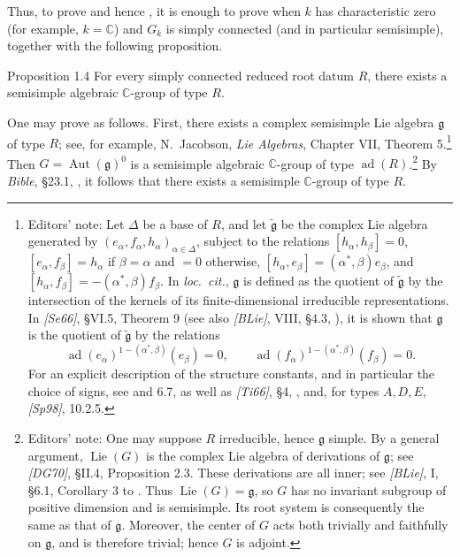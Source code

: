 Thus, to prove  and hence , it is enough to prove  when \(k\) has
characteristic zero (for example, \(k=\mathbb C\)) and \(G_k\) is simply
connected (and in particular semisimple), together with the following
proposition.

\begin{sgastatement}{Proposition 1.4}
For every simply connected reduced root datum \(R\), there exists a semisimple
algebraic \(\mathbb C\)-group of type \(R\).
\end{sgastatement}

One may prove  as follows. First, there exists a complex semisimple Lie
algebra \(\mathfrak g\) of type \(R\); see, for example, N.~Jacobson,
\textit{Lie Algebras}, Chapter VII, Theorem 5.\footnote{Editors' note:
Let \(\Delta\) be a base of \(R\), and let \(\widetilde{\mathfrak g}\) be the
complex Lie algebra generated by
\((e_\alpha,f_\alpha,h_\alpha)_{\alpha\in\Delta}\), subject to the relations
\([h_\alpha,h_\beta]=0\), \([e_\alpha,f_\beta]=h_\alpha\) if
\(\beta=\alpha\) and \(=0\) otherwise,
\([h_\alpha,e_\beta]=(\alpha^\ast,\beta)e_\beta\), and
\([h_\alpha,f_\beta]=-(\alpha^\ast,\beta)f_\beta\).
In \emph{loc.\ cit.}, \(\mathfrak g\) is defined as the quotient of
\(\widetilde{\mathfrak g}\) by the intersection of the kernels of its
finite-dimensional irreducible representations. In \emph{[Se66]},
\S VI.5, Theorem 9 (see also \emph{[BLie]}, VIII, \S4.3, ), it is
shown that \(\mathfrak g\) is the quotient of \(\widetilde{\mathfrak g}\) by
the relations
\[
 \operatorname{ad}(e_\alpha)^{1-(\alpha^\ast,\beta)}(e_\beta)=0,\qquad
 \operatorname{ad}(f_\alpha)^{1-(\alpha^\ast,\beta)}(f_\beta)=0.
\]
For an explicit description of the structure constants, and in particular
the choice of signs, see  and 6.7, as well as
\emph{[Ti66]}, \S4, , and, for types \(A,D,E\),
\emph{[Sp98]}, 10.2.5.}
Then \(G=\operatorname{Aut}(\mathfrak g)^0\) is a semisimple algebraic
\(\mathbb C\)-group of type \(\operatorname{ad}(R)\).\footnote{Editors' note:
One may suppose \(R\) irreducible, hence \(\mathfrak g\) simple. By a general
argument, \(\operatorname{Lie}(G)\) is the complex Lie algebra of derivations
of \(\mathfrak g\); see \emph{[DG70]}, \S II.4, Proposition 2.3. These
derivations are all inner; see \emph{[BLie]}, I, \S6.1, Corollary 3 to
. Thus \(\operatorname{Lie}(G)=\mathfrak g\), so \(G\) has no
invariant subgroup of positive dimension and is semisimple. Its root system
is consequently the same as that of \(\mathfrak g\). Moreover, the center of
\(G\) acts both trivially and faithfully on \(\mathfrak g\), and is therefore
trivial; hence \(G\) is adjoint.}
By \textit{Bible}, \S23.1, , it follows that there exists a
semisimple \(\mathbb C\)-group of type \(R\).

